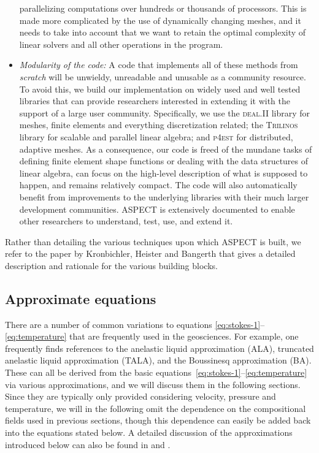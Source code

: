 \documentclass{article}
\newcommand{\dealii}{{\textsc{deal.II}}}
\newcommand{\pfrst}{{\normalfont\textsc{p4est}}}
\newcommand{\trilinos}{{\textsc{Trilinos}}}
\newcommand{\aspect}{\textsc{ASPECT}}
\begin{document}
\begin{itemize}
  parallelizing computations over hundreds or thousands of processors. This is
  made more complicated by the use of dynamically changing meshes, and it
  needs to take into account that we want to retain the optimal complexity of
  linear solvers and all other operations in the program.
\item \textit{Modularity of the code:} A code that implements all of these
  methods from \textit{scratch} will be unwieldy, unreadable and unusable as a community
  resource. To avoid this, we build our implementation on widely used and well
  tested libraries that can provide researchers interested in extending it
  with the support of a large user community. Specifically, we use the
  \dealii{} library \cite{BHK07,BK99m} for meshes, finite
  elements and everything discretization related; the \trilinos{} library
  \cite{trilinos,trilinos-web-page} for scalable and parallel linear algebra;
  and \pfrst{} \cite{p4est} for distributed, adaptive meshes. As a
  consequence, our code is freed of the mundane tasks of defining finite
  element shape functions or dealing with the data structures of linear algebra,
  can focus on the high-level description of what is supposed to happen, and
  remains relatively compact. The code will also
  automatically benefit from improvements to the underlying libraries with
  their much larger development communities. \aspect{} is extensively
  documented to enable other researchers to understand, test, use, and extend it.
\end{itemize}

Rather than detailing the various techniques upon which \aspect{} is built, we
refer to the paper by Kronbichler, Heister and Bangerth \cite{KHB12} that
gives a detailed description and rationale for the various building blocks.


\subsection{Approximate equations}
\label{sec:approximate-equations}

There are a number of common variations to equations
\eqref{eq:stokes-1}--\eqref{eq:temperature} that are frequently used in the
geosciences. For example, one frequently finds references to the anelastic liquid
approximation (ALA), truncated anelastic liquid approximation (TALA), and the
Boussinesq approximation (BA). These can all be derived from the basic
equations~\eqref{eq:stokes-1}--\eqref{eq:temperature} via various approximations, 
and we will discuss them in the following sections. Since they are typically only provided
considering velocity, pressure and temperature, we will in the following omit
the dependence on the compositional fields used in previous sections, though
this dependence can easily be added back into the equations stated below. A
detailed discussion of the approximations introduced below can also be found in \cite{STO01} and 
\cite{KLKLZTTK10}.
\end{document}
